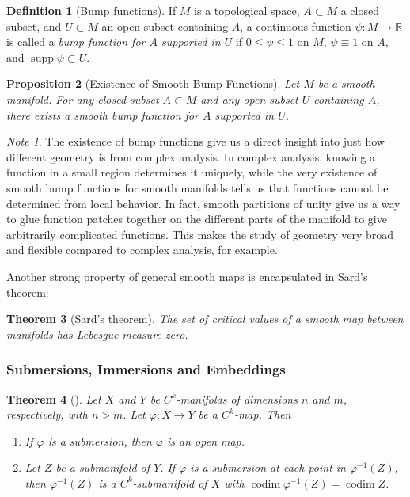 \documentclass[reqno]{amsart}
\newtheorem{theorem}{Theorem}[section]
\newtheorem{proposition}[theorem]{Proposition}
\theoremstyle{definition}
\newtheorem{definition}[theorem]{Definition}
\theoremstyle{remark}
\newtheorem*{note}{Note}
\DeclareMathOperator{\codim}{codim}
\DeclareMathOperator{\supp}{supp}
\begin{document}
\begin{definition}[Bump functions]
    If $M$ is a topological space, $A \subset M$ 
    a closed subset, and
    $U \subset M$ an open subset containing $A$, a
    continuous function
    $\psi \colon M \to \mathbb{R}$ is called a
    \textit{bump function for $A$ supported
    in $U$} if $0 \le \psi  \le 1$ on
    $M$, $\psi \equiv 1$ on $A$, and $\supp \psi \subset U$.
\end{definition}

\begin{proposition}[Existence of Smooth Bump Functions]
    Let $M$ be a smooth manifold. For any closed
    subset $A \subset M$ and any open subset
    $U$ containing $A$, there exists a smooth bump function
    for $A$ supported in $U$.
\end{proposition}

\begin{note}
    The existence of bump functions give us a
    direct insight into just how different
    geometry is from complex analysis. 
    In complex analysis, knowing a function in a
    small region determines it uniquely, while
    the very existence of smooth bump functions
    for smooth manifolds tells us
    that functions cannot be determined from local
    behavior.
    In fact, smooth partitions of unity give
    us a way to glue function patches together
    on the different parts of the manifold to give
    arbitrarily complicated functions.
    This makes the study of geometry very broad and flexible compared
    to complex analysis, for example.
\end{note}


Another strong property of general smooth maps is
encapsulated in Sard's theorem:

\begin{theorem}[Sard's theorem]
    The set of critical values of a smooth
    map between manifolds has Lebesgue measure zero.
\end{theorem}


\subsubsection{Submersions, Immersions and Embeddings}

\begin{theorem}[]\cite[Thm 2.8]{GG}
    Let $X$ and $Y$ be $C^{k}$-manifolds of
    dimensions $n$ and $m$, respectively, with $n > m$. Let
    $\varphi  \colon X \to Y$ be a $C^{k}$-map. Then
    \begin{enumerate}
        \item If $\varphi $ is a submersion, then $\varphi $ is
            an open map.
        \item Let $Z$ be a submanifold of $Y$. If
            $\varphi $ is a submersion at each point
            in $\varphi^{-1}(Z)$, then
            $\varphi^{-1}(Z)$ is a $C^{k}$-submanifold of
            $X$ with $\codim \varphi^{-1}(Z) = 
            \codim Z$.
    \end{enumerate}
\end{theorem}
\end{document}

